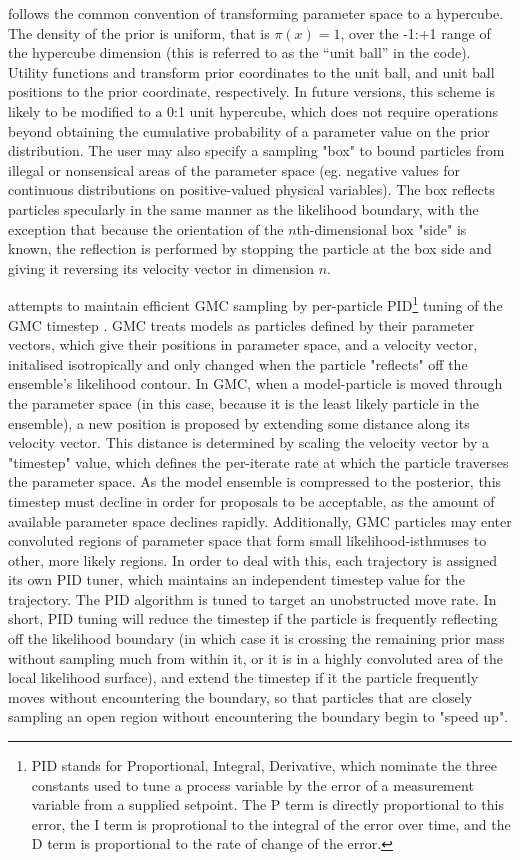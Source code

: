 follows the common convention of transforming parameter space to a hypercube. The density of the prior is uniform, that is $\pi(x) = 1$, over the -1:+1 range of the hypercube dimension (this is referred to as the ``unit ball'' in the code). Utility functions  and  transform prior coordinates to the unit ball, and unit ball positions to the prior coordinate, respectively. In future versions, this scheme is likely to be modified to a 0:1 unit hypercube, which does not require operations beyond obtaining the cumulative probability of a parameter value on the prior distribution. The user may also specify a sampling "box" to bound particles from illegal or nonsensical areas of the parameter space (eg. negative values for continuous distributions on positive-valued physical variables). The box reflects particles specularly in the same manner as the likelihood boundary, with the exception that because the orientation of the $n$th-dimensional box "side" is known, the reflection is performed by stopping the particle at the box side and giving it reversing its velocity vector in dimension $n$. 

 attempts to maintain efficient GMC sampling by per-particle PID\footnote{PID stands for Proportional, Integral, Derivative, which nominate the three constants used to tune a process variable by the error of a measurement variable from a supplied setpoint. The P term is directly proportional to this error, the I term is proprotional to the integral of the error over time, and the D term is proportional to the rate of change of the error.} tuning of the GMC timestep \cite{Visioli2012}. GMC treats models as particles defined by their parameter vectors, which give their positions in parameter space, and a velocity vector, initalised isotropically and only changed when the particle "reflects" off the ensemble's likelihood contour. In GMC, when a model-particle is moved through the parameter space (in this case, because it is the least likely particle in the ensemble), a new position is proposed by extending some distance along its velocity vector. This distance is determined by scaling the velocity vector by a "timestep" value, which defines the per-iterate rate at which the particle traverses the parameter space. As the model ensemble is compressed to the posterior, this timestep must decline in order for proposals to be acceptable, as the amount of available parameter space declines rapidly. Additionally, GMC particles may enter convoluted regions of parameter space that form small likelihood-isthmuses to other, more likely regions. In order to deal with this, each trajectory is assigned its own PID tuner, which maintains an independent timestep value for the trajectory. The PID algorithm is tuned to target an unobstructed move rate. In short, PID tuning will reduce the timestep if the particle is frequently reflecting off the likelihood boundary (in which case it is crossing the remaining prior mass without sampling much from within it, or it is in a highly convoluted area of the local likelihood surface), and extend the timestep if it the particle frequently moves without encountering the boundary, so that particles that are closely sampling an open region without encountering the boundary begin to "speed up".


